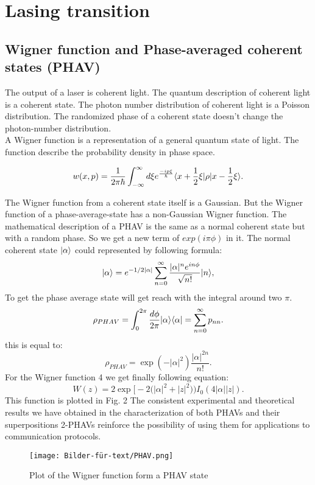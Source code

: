 \documentclass[12pt,a4paper]{article}
\makeatletter
\DeclarePairedDelimiter\bra{\langle}{\rvert}
\DeclarePairedDelimiter\ket{\lvert}{\rangle}
\def\eqref{\@ifstar\@eqref\@@eqref}
\def\@eqref#1{\textup{\tagform@{\ref*{#1}}}}
\def\@@eqref#1{\textup{\tagform@{\ref{#1}}}}
\makeatother
\begin{document}
\section{Lasing transition}

\subsection{Wigner function and Phase-averaged coherent states (PHAV)}
The output of a laser is coherent light.
The quantum description of coherent light is a coherent state. The photon number distribution of coherent light is a Poisson distribution. The randomized phase of a coherent state doesn't change the photon-number distribution. \\

A Wigner function is a representation of a general quantum state of light.
The function describe the probability density in phase space.

\begin{equation}
w(x,p)=\frac{1}{2\pi \hbar}\int_{- \infty}^{\infty} d\xi e^{\frac{-i p \xi}{\hbar}}\bra{x+\frac{1}{2}\xi}\rho\ket{x-\frac{1}{2}\xi}.\label{4}
\end{equation}

The Wigner function from a coherent state itself is a Gaussian. But the Wigner function of a phase-average-state has a non-Gaussian Wigner function. 
The mathematical description of a  PHAV is the same as a normal coherent state but with a random phase. So we get a new term of $exp(i\pi\phi)$ in it. 
The normal coherent state $\ket{\alpha}$ could represented by following formula: \cite{Allevi2013}
\begin{equation}
\ket{\alpha}=e^{-1/2|\alpha|}\sum_{n=0}^{\infty}\frac{|\alpha|^n e^{in\phi}}{\sqrt{n!}} \ket{n},
\end{equation}
To get the phase average state will get reach with the integral around two $\pi$.
\begin{equation}
\rho_{PHAV}=\int_0 ^{2\pi}\frac{d\phi}{2\pi}\ket{\alpha}\bra{\alpha}=\sum_{n=0}^{\infty}p_{nn}.
\end{equation}
this is equal to:
\begin{equation}
\rho_{PHAV}= \exp(-|\alpha|^2)\frac{|\alpha|^{2n}}{n!}.
\end{equation}
For the Wigner function \eqref{4} we get finally following equation:
\begin{equation}
W(z)=2  \exp\bigl[-2\bigl(|\alpha|^2+|z|^2\bigr)\bigr) I_0 (4|\alpha| |z|).
\end{equation}
This function is plotted in Fig. 2
The consistent experimental and theoretical results we have obtained in the characterization of both PHAVs and their superpositions 2-PHAVs reinforce the
possibility of using them for applications to communication protocols. \cite{Allevi2013}
\begin{figure}[h!]
\centering
\texttt{[image: Bilder-für-text/PHAV.png]}
\caption{Plot of the Wigner function form a PHAV state}
\end{figure}
\end{document}
